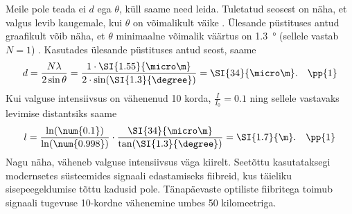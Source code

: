Meile pole teada ei $d$ ega $\theta$, küll saame need leida. Tuletatud seosest on näha, et valgus levib kaugemale, kui $\theta$ on võimalikult väike . Ülesande püstituses antud graafikult võib näha, et $\theta$ minimaalne võimalik väärtus on \SI{1.3}{\degree} (sellele vastab $N=1$) . Kasutades ülesande püstituses antud seost, saame
$$d = \frac{N\lambda}{2\sin\theta}=\frac{1\cdot\SI{1.55}{\micro\m}}{2\cdot\sin(\SI{1.3}{\degree})}=\SI{34}{\micro\m}. \quad \pp{1}$$
Kui valguse intensiivsus on vähenenud 10 korda, $\frac{I}{I_0}=0.1$  ning sellele vastavaks levimise distantsiks saame
$$l=\frac{\ln(\num{0.1})}{\ln(\num{0.998})}\cdot\frac{\SI{34}{\micro\m}}{\tan(\SI{1.3}{\degree})}=\SI{1.7}{\m}. \quad \pp{1}$$
Nagu näha, väheneb valguse intensiivsus väga kiirelt. Seetõttu kasutataksegi modernsetes süsteemides signaali edastamiseks fiibreid, kus täieliku sisepeegeldumise tõttu kadusid pole. Tänapäevaste optiliste fiibritega toimub signaali tugevuse 10-kordne vähenemine umbes 50 kilomeetriga.
\probend